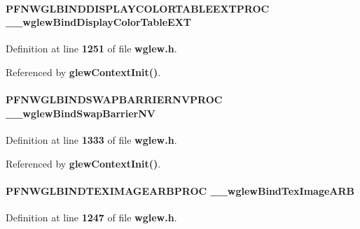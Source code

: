 \paragraph[{\+\_\+\+\_\+wglew\+Bind\+Display\+Color\+Table\+E\+XT}]{ P\+F\+N\+W\+G\+L\+B\+I\+N\+D\+D\+I\+S\+P\+L\+A\+Y\+C\+O\+L\+O\+R\+T\+A\+B\+L\+E\+E\+X\+T\+P\+R\+OC \+\_\+\+\_\+wglew\+Bind\+Display\+Color\+Table\+E\+XT}\label{wglew_8h_ad9f50c60cf5f1324b8eeed81dfe042ed}


Definition at line {\bf 1251} of file {\bf wglew.\+h}.



Referenced by {\bf glew\+Context\+Init()}.

\paragraph[{\+\_\+\+\_\+wglew\+Bind\+Swap\+Barrier\+NV}]{ P\+F\+N\+W\+G\+L\+B\+I\+N\+D\+S\+W\+A\+P\+B\+A\+R\+R\+I\+E\+R\+N\+V\+P\+R\+OC \+\_\+\+\_\+wglew\+Bind\+Swap\+Barrier\+NV}\label{wglew_8h_aba831fd9b4d85b6daa68b5986bc1a1d1}


Definition at line {\bf 1333} of file {\bf wglew.\+h}.



Referenced by {\bf glew\+Context\+Init()}.

\paragraph[{\+\_\+\+\_\+wglew\+Bind\+Tex\+Image\+A\+RB}]{ P\+F\+N\+W\+G\+L\+B\+I\+N\+D\+T\+E\+X\+I\+M\+A\+G\+E\+A\+R\+B\+P\+R\+OC \+\_\+\+\_\+wglew\+Bind\+Tex\+Image\+A\+RB}\label{wglew_8h_a8f38e26a7ce7e95604646e90ac3224ef}


Definition at line {\bf 1247} of file {\bf wglew.\+h}.



